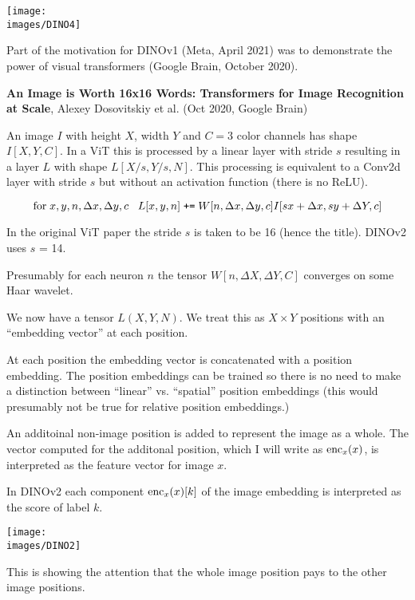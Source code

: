 {{\centerline{\texttt{[image: \\images/DINO4]}}


Part of the motivation for DINOv1 (Meta, April 2021) was to demonstrate the power of visual transformers (Google Brain, October 2020).

\vfill
{\bf An Image is Worth 16x16 Words: Transformers for Image Recognition at Scale}, Alexey Dosovitskiy et al. (Oct 2020, Google Brain)


An image $I$ with height $X$, width $Y$ and $C = 3$ color channels has shape
$I[X,Y,C]$.  In a ViT this is processed by a linear layer with stride $s$ resulting in a layer $L$ with shape $L[X/s,Y/s,N]$.
This processing is equivalent to a Conv2d layer with stride $s$ but
without an activation function (there is no ReLU).

$$\mbox{for}\;x,y,n,\Delta x, \Delta y, c\;\;\;L[x,y,n] \;\mbox{\tt +=}\; W[n,\Delta x,\Delta y,c]I[sx+\Delta x,sy+\Delta Y,c]$$

\vfill
In the original ViT paper the stride $s$ is taken to be 16 (hence the title). DINOv2 uses $s$ = 14.

\vfill
Presumably for each neuron $n$ the tensor $W[n,\Delta X,\Delta Y,C]$ converges on some Haar wavelet.


We now have a tensor $L(X,Y,N)$. We treat this as $X \times Y$ positions with an ``embedding vector'' at each position.

\vfill
At each position the embedding vector is concatenated with a position embedding. The position embeddings can be trained so there is no need
to make a distinction between ``linear'' vs. ``spatial'' position embeddings (this would presumably not be true for relative position embeddings.)

\vfill
An additoinal non-image  position is added to represent the image as a whole. The vector computed for the additonal position, which I will write as $\mathrm{enc}_x(x)$, is interpreted as the feature vector
for image $x$.

\vfill
In DINOv2 each component $\mathrm{enc}_x(x)[k]$ of the image embedding is interpreted as the score of label $k$.


\centerline{\texttt{[image: \\images/DINO2]}}

\vfill
This is showing the attention that the whole image position pays to the other image positions.

}}
